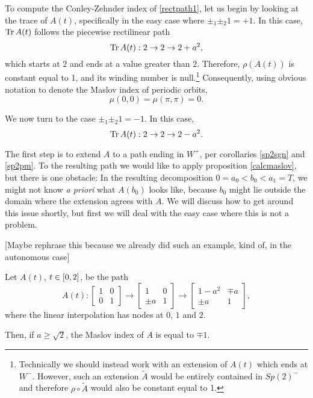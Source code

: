 To compute the Conley-Zehnder index of \eqref{rectpath1}, let us begin by looking at the trace of $A(t)$, specifically in the easy case where $\pm_1 \pm_2 1 = +1$. In this case, $\operatorname{Tr} A(t)$ follows the piecewise rectilinear path
\begin{equation}
\operatorname{Tr} A(t) : 2 \to 2 \to 2 + a^2,
\end{equation}
which starts at $2$ and ends at a value greater than $2$. Therefore, $\rho(A(t))$ is constant equal to 1, and its winding number is null.\footnote{Technically we should instead work with an extension of $A(t)$ which ends at $W^-$. However, such an extension $\tilde A$ would be entirely contained in $Sp(2)^-$ and therefore $\rho \circ \tilde A$ would also be constant equal to 1.} Consequently, using obvious notation to denote the Maslov index of periodic orbits,
\begin{equation}
\mu(0,0) = \mu(\pi,\pi) = 0.
\end{equation}

We now turn to the case $\pm_1 \pm_2 1 = -1$. In this case,
\begin{equation}
\operatorname{Tr} A(t) : 2 \to 2 \to 2 - a^2.
\end{equation}

The first step is to extend $A$ to a path ending in $W^+$, per corollaries \ref{sp2sgn} and \ref{sp2pm}. To the resulting path we would like to apply proposition \ref{calcmaslov}, but there is one obstacle: In the resulting decomposition $0 = a_0 < b_0 < a_1 = T$, we might not know \textit{a priori} what $A(b_0)$ looks like, because $b_0$ might lie outside the domain where the extension agrees with $A$. We will discuss how to get around this issue shortly, but first we will deal with the easy case where this is not a problem.

[Maybe rephrase this because we already did such an example, kind of, in the autonomous case]

\begin{prop}\label{easymaslov}
Let $A(t)$, $t \in \interval02$, be the path
\begin{equation}
A(t):
\begin{bmatrix}
1 & 0\\
0 & 1
\end{bmatrix}
\to
\begin{bmatrix}
1 & 0\\
\pm a & 1
\end{bmatrix}
\to
\begin{bmatrix}
1 - a^2 &  \mp a\\
\pm a & 1
\end{bmatrix},
\end{equation}
where the linear interpolation has nodes at $0$, $1$ and $2$.

Then, if $a \geq \sqrt2$, the Maslov index of $A$ is equal to $\mp 1$.
\end{prop}

